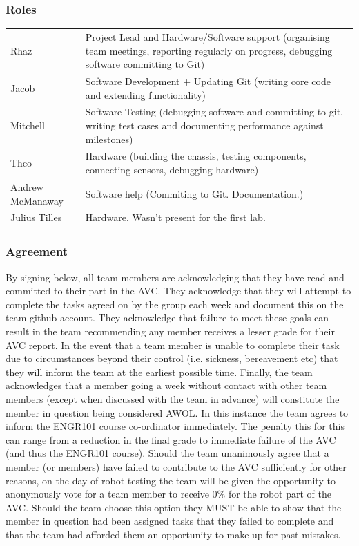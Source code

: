 \documentclass[paper=a4, fontsize=11pt]{scrartcl} %
\numberwithin{equation}{section} %
\numberwithin{figure}{section} %
\begin{document}
\subsubsection{Roles}
\begin{tabularx}{\textwidth}{XX}
Rhaz & Project Lead and Hardware/Software support (organising team meetings,
reporting regularly on progress, debugging software committing to Git)\\
Jacob & Software Development + Updating Git (writing core code and extending
functionality)\\
Mitchell & Software Testing (debugging software and committing to git, writing
test cases and documenting performance against milestones)\\
Theo & Hardware (building the chassis, testing components, connecting sensors,
debugging hardware)\\
Andrew McManaway & Software help (Commiting to Git. Documentation.)\\
Julius Tilles & Hardware. Wasn't present for the first lab.\\
\end{tabularx}

\subsubsection{Agreement}
By signing below, all team members are acknowledging that they have read and
committed to their part in the AVC. They acknowledge that they will attempt to
complete the tasks agreed on by the group each week and document this on the
team github account. They acknowledge that failure to meet these goals can
result in the team recommending any member receives a lesser grade for their AVC
report. In the event that a team member is unable to complete their task due to
circumstances beyond their control (i.e. sickness, bereavement etc) that they
will inform the team at the earliest possible time. Finally, the team
acknowledges that a member going a week without contact with other team members
(except when discussed with the team in advance) will constitute the member in
question being considered AWOL. In this instance the team agrees to inform the
ENGR101 course co-ordinator immediately. The penalty this for this can range
from a reduction in the final grade to immediate failure of the AVC (and thus
the ENGR101 course). Should the team unanimously agree that a member (or
members) have failed to contribute to the AVC sufficiently for other reasons, on
the day of robot testing the team will be given the opportunity to anonymously
vote for a team member to receive 0\% for the robot part of the AVC. Should the
team choose this option they MUST be able to show that the member in question
had been assigned tasks that they failed to complete and that the team had
afforded them an opportunity to make up for past mistakes.
\end{document}
